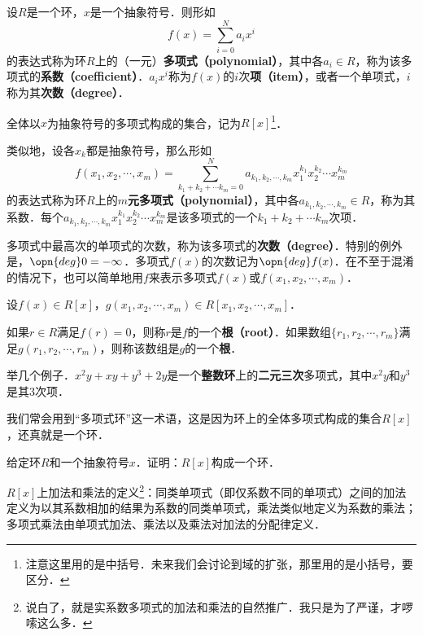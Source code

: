 \begin{definition}{}

设$R$是一个环，$x$是一个抽象符号．则形如
\begin{equation}
    f(x) = \sum_{i=0}^N a_i x^i
\end{equation}
的表达式称为环$R$上的（一元）\textbf{多项式（polynomial）}，其中各$a_i\in R$，称为该多项式的\textbf{系数（coefficient）}．$a_i x^i$称为$f(x)$的$i$次\textbf{项（item）}，或者一个单项式，$i$称为其\textbf{次数（degree）}．

全体以$x$为抽象符号的多项式构成的集合，记为$R[x]$\footnote{注意这里用的是中括号．未来我们会讨论到域的扩张，那里用的是小括号，要区分．}．

类似地，设各$x_k$都是抽象符号，那么形如
\begin{equation}
    f(x_1, x_2, \cdots, x_m) = \sum_{k_1+k_2+\cdots k_m=0}^N a_{k_1, k_2, \cdots, k_m} x_1^{k_1}x_2^{k_2}\cdots x_m^{k_m}
\end{equation}
的表达式称为环$R$上的\textbf{$m$元多项式（polynomial）}，其中各$a_{k_1, k_2, \cdots, k_m}\in R$，称为其系数．每个$a_{k_1, k_2, \cdots, k_m} x_1^{k_1}x_2^{k_2}\cdots x_m^{k_m}$是该多项式的一个$k_1+k_2+\cdots k_m$次项．

多项式中最高次的单项式的次数，称为该多项式的\textbf{次数（degree）}．特别的例外是，$\opn{deg}0 = -\infty$．多项式$f(x)$的次数记为$\opn{deg} f(x)$．在不至于混淆的情况下，也可以简单地用$f$来表示多项式$f(x)$或$f(x_1, x_2, \cdots, x_m)$．

\end{definition}

\begin{definition}{}

设$f(x)\in R[x]$，$g(x_1, x_2, \cdots, x_m)\in R[x_1, x_2, \cdots, x_m]$．

如果$r\in R$满足$f(r)=0$，则称$r$是$f$的一个\textbf{根（root）}．如果数组$\{r_1, r_2, \cdots, r_m\}$满足$g(r_1, r_2, \cdots, r_m)$，则称该数组是$g$的一个\textbf{根}．

\end{definition}

举几个例子．$x^2y+xy+y^3+2y$是一个\textbf{整数环}上的\textbf{二元三次}多项式，其中$x^2y$和$y^3$是其$3$次项．

我们常会用到“多项式环”这一术语，这是因为环上的全体多项式构成的集合$R[x]$，还真就是一个环．

\begin{exercise}{}
给定环$R$和一个抽象符号$x$．证明：$R[x]$构成一个环．

$R[x]$上加法和乘法的定义\footnote{说白了，就是实系数多项式的加法和乘法的自然推广．我只是为了严谨，才啰嗦这么多．}：同类单项式（即仅系数不同的单项式）之间的加法定义为以其系数相加的结果为系数的同类单项式，乘法类似地定义为系数的乘法；多项式乘法由单项式加法、乘法以及乘法对加法的分配律定义．
\end{exercise}

